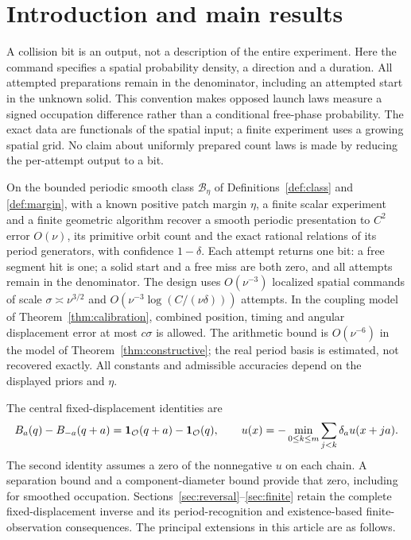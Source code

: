 \section*{Introduction and main results}
A collision bit is an output, not a description of the entire
experiment. Here the command specifies a spatial probability density,
a direction and a duration. All attempted preparations remain in the
denominator, including an attempted start in the unknown solid. This
convention makes opposed launch laws measure a signed occupation
difference rather than a conditional free-phase probability. The exact
data are functionals of the spatial input; a finite experiment uses a
growing spatial grid. No claim about uniformly prepared count laws is
made by reducing the per-attempt output to a bit.

\begin{maintheorem}
On the bounded periodic smooth class $\mathcal B_\eta$ of
Definitions~\ref{def:class} and \ref{def:margin}, with a known positive
patch margin $\eta$, a finite scalar experiment and a finite geometric
algorithm recover a smooth periodic presentation to $C^2$ error
$O(\nu)$, its primitive orbit count and the exact rational relations
of its period generators, with confidence $1-\delta$.
Each attempt returns one bit: a free segment hit is one; a solid start
and a free miss are both zero, and all attempts remain in the denominator.
The design uses $O(\nu^{-3})$ localized spatial commands of scale
$\sigma\asymp\nu^{3/2}$ and
$O(\nu^{-3}\log(C/(\nu\delta)))$ attempts. In the coupling model of
Theorem~\ref{thm:calibration}, combined position, timing and angular
displacement error at most $c\sigma$ is allowed. The arithmetic bound
is $O(\nu^{-6})$ in the model of Theorem~\ref{thm:constructive}; the
real period basis is estimated, not recovered exactly. All constants
and admissible accuracies depend on the displayed priors and $\eta$.
\end{maintheorem}

The central fixed-displacement identities are
\[
 B_a(q)-B_{-a}(q+a)=\mathbf 1_{\mathcal O}(q+a)-\mathbf 1_{\mathcal O}(q),
 \qquad
 u(x)=-\min_{0\le k\le m}\sum_{j<k}\delta_a u(x+ja).
\]
The second identity assumes a zero of the nonnegative $u$ on each chain.
A separation bound and a component-diameter bound provide that zero,
including for smoothed occupation. Sections~\ref{sec:reversal}--\ref{sec:finite}
retain the complete fixed-displacement inverse and its period-recognition
and existence-based finite-observation consequences. The principal
extensions in this article are as follows.

